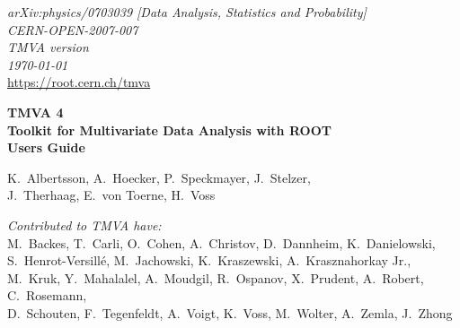 \vspace{-1cm}
\begin{flushright}
{\sf\em arXiv:physics/0703039 [Data Analysis, Statistics and Probability]} \\
{\sf\em CERN-OPEN-2007-007} \\
{\sf\em TMVA version \TMVAVersion} \\
{\sf\em \today} \\
\def\UrlFont{\sf\em}
\url{https://root.cern.ch/tmva} 
\end{flushright}
\def\UrlFont{\rm}

\def\miniPageOffset{0.2cm}
\def\miniPageWidth{13.5cm}
\HRule
\begin{flushleft}
\hspace{\miniPageOffset}\begin{minipage}{\miniPageWidth}
{\sf\Huge\bfseries\boldmath TMVA 4} \\[0.2cm]
{\sf\Large\bfseries\boldmath Toolkit for Multivariate Data Analysis with ROOT} \\[1cm]
{\sf\Huge\bfseries\boldmath Users Guide} 
\end{minipage}
\end{flushleft}
\HRule
\vspace{2.0cm}
\begin{flushright}
{\sf\Large K.~Albertsson, A.~Hoecker, P.~Speckmayer, J.~Stelzer,\\
           J.~Therhaag, E.~von Toerne, H.~Voss}

\vspace{1.2cm}
{\sf\em\large Contributed to TMVA have:} \\[0.4cm]
{\sf\large 
M.~Backes,
T.~Carli,
O.~Cohen,
A.~Christov, 
D.~Dannheim,
K.~Danielowski,\\[0.1cm]
S.~Henrot-Versill\'e, 
M.~Jachowski, 
K.~Kraszewski,
A.~Krasznahorkay Jr.,  \\[0.1cm]    
M.~Kruk,
Y.~Mahalalel,
A.~Moudgil,
R.~Ospanov,
X.~Prudent,
A.~Robert,
C.~Rosemann, \\[0.1cm]  
D.~Schouten,
F.~Tegenfeldt,
A.~Voigt,
K.~Voss,
M.~Wolter,
A.~Zemla,
J.~Zhong
}

\end{flushright}

